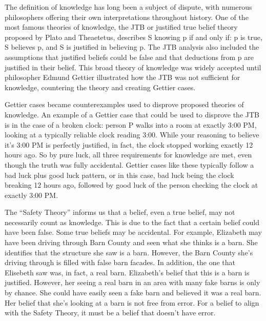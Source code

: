 \documentclass[12pt, a4paper, twoside]{article}
\begin{document}
\maketitle{}

The definition of knowledge has long been a subject of dispute, with numerous philosophers offering their own interpretations throughout history. One of the most famous theories of knowledge, the JTB or justified true belief theory proposed by Plato and Theaetetus, describes S knowing p if and only if: p is true, S believes p, and S is justified in believing p. The JTB analysis also included the assumptions that justified beliefs could be false and that deductions from p are justified in their belief. This broad theory of knowledge was widely accepted until philosopher Edmund Gettier illustrated how the JTB was not sufficient for knowledge, countering the theory and creating Gettier cases.

Gettier cases became counterexamples used to disprove proposed theories of knowledge. An example of a Gettier case that could be used to disprove the JTB is in the case of a broken clock: person P walks into a room at exactly 3:00 PM, looking at a typically reliable clock reading 3:00. While your reasoning to believe it’s 3:00 PM is perfectly justified, in fact, the clock stopped working exactly 12 hours ago. So by pure luck, all three requirements for knowledge are met, even though the truth was fully accidental. Gettier cases like these typically follow a bad luck plus good luck pattern, or in this case, bad luck being the clock breaking 12 hours ago, followed by good luck of the person checking the clock at exactly 3:00 PM.

The “Safety Theory” informs us that a belief, even a true belief, may not necessarily count as knowledge. This is due to the fact that a certain belief could have been false. Some true beliefs may be accidental. For example, Elizabeth may have been driving through Barn County and seen what she thinks is a barn. She identifies that the structure she saw is a barn. However, the Barn County she’s driving through is filled with false barn facades. In addition,  the one that Elisebeth saw was, in fact, a real barn. Elizabeth’s belief that this is a barn is justified. However, her seeing a real barn in an area with many fake barns is only by chance. She could have easily seen a fake barn and believed it was a real barn. Her belief that she’s looking at a barn is not free from error. For a belief to align with the Safety Theory, it must be a belief that doesn’t have error.
\end{document}
